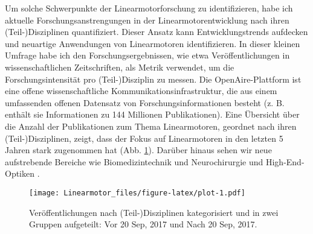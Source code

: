 \documentclass[
  oneside]{book}
\begin{document}
Um solche Schwerpunkte der Linearmotorforschung zu identifizieren, habe ich aktuelle Forschungsanstrengungen in der Linearmotorentwicklung nach ihren (Teil-)Disziplinen quantifiziert. Dieser Ansatz kann Entwicklungstrends aufdecken und neuartige Anwendungen von Linearmotoren identifizieren. In dieser kleinen Umfrage habe ich den Forschungsergebnissen, wie etwa Veröffentlichungen in wissenschaftlichen Zeitschriften, als Metrik verwendet, um die Forschungsintensität pro (Teil-)Disziplin zu messen. Die OpenAire-Plattform \citep{openaire2022} ist eine offene wissenschaftliche Kommunikationsinfrastruktur, die aus einem umfassenden offenen Datensatz von Forschungsinformationen besteht (z. B. enthält sie Informationen zu 144 Millionen Publikationen). Eine Übersicht über die Anzahl der Publikationen zum Thema Linearmotoren, geordnet nach ihren (Teil-)Disziplinen, zeigt, dass der Fokus auf Linearmotoren in den letzten 5 Jahren stark zugenommen hat (Abb. \ref{fig:plot}). Darüber hinaus sehen wir neue aufstrebende Bereiche wie Biomedizintechnik und Neurochirurgie \citep{alberto2018, zamanian2019, fromme2019, do2019} und High-End-Optiken \citep[Rasterelektronenmikroskope][]{mo2017}.

\begin{figure}
\centering
\texttt{[image: Linearmotor\_files/figure-latex/plot-1.pdf]}
\caption{\label{fig:plot}Veröffentlichungen nach (Teil-)Disziplinen kategorisiert und in zwei Gruppen aufgeteilt: Vor 20 Sep, 2017 und Nach 20 Sep, 2017.}
\end{figure}
\end{document}
